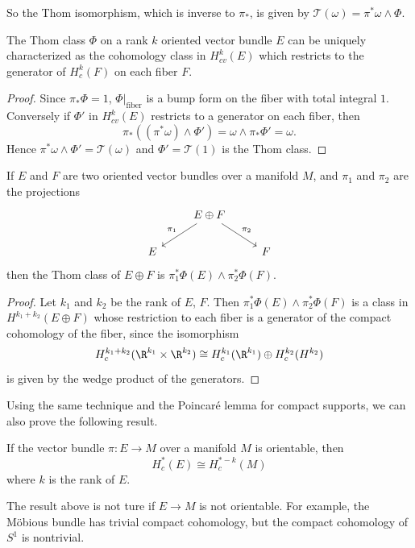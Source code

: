 So the Thom isomorphism, which is inverse to $\pi_*$, is given by $\mathscr{T}(\omega)=\pi^*\omega\wedge\Phi$.
\begin{proposition}\label{Thom class iff generator on fiber}
The Thom class $\Phi$ on a rank $k$ oriented vector bundle $E$ can be uniquely characterized as the cohomology class in $H^k_{cv}(E)$ which restricts to the generator 
of $H^k_c(F)$ on each fiber $F$.
\end{proposition}
\begin{proof}
Since $\pi_*\Phi=1$, $\Phi|_{\text{fiber}}$ is a bump form on the fiber with total integral $1$. Conversely if $\Phi'$ in $H^k_{cv}(E)$ restricts to a generator on each 
fiber, then
\[\pi_*((\pi^*\omega)\wedge\Phi')=\omega\wedge\pi_*\Phi'=\omega.\]
Hence $\pi^*\omega\wedge\Phi'=\mathscr{T}(\omega)$ and $\Phi'=\mathscr{T}(1)$ is the Thom class.
\end{proof}
\begin{proposition}\label{Thom class disrect sum}
If $E$ and $F$ are two oriented vector bundles over a manifold $M$, and $\pi_1$ and $\pi_2$ are the projections
\[\begin{tikzcd}
&E\oplus F\ar[ld,swap,"\pi_1"]\ar[rd,"\pi_2"]&\\
E&&F
\end{tikzcd}\]
then the Thom class of $E\oplus F$ is $\pi_1^*\Phi(E)\wedge\pi_2^*\Phi(F)$.
\end{proposition}
\begin{proof}
Let $k_1$ and $k_2$ be the rank of $E$, $F$. Then $\pi_1^*\Phi(E)\wedge\pi_2^*\Phi(F)$ is a class in $H^{k_1+k_2}(E\oplus F)$ whose restriction to each fiber is a 
generator of the compact cohomology of the fiber, since the isomorphism
\[H_c^{k_1+k_2}(\R^{k_1}\times\R^{k_2})\cong H_c^{k_1}(\R^{k_1})\oplus H_c^{k_2}(H^{k_2})\]
is given by the wedge product of the generators.
\end{proof}
Using the same technique and the Poincar\'e lemma for compact supports, we can also prove the following result.
\begin{proposition}
If the vector bundle $\pi:E\to M$ over a manifold $M$ is orientable, then
\[H^*_{c}(E)\cong H^{*-k}_c(M)\]
where $k$ is the rank of $E$.
\end{proposition}
\begin{remark}
The result above is not ture if $E\to M$ is not orientable. For example, the M\"obious bundle has trivial compact cohomology, but the compact cohomology of 
$S^1$ is nontrivial.
\end{remark}

